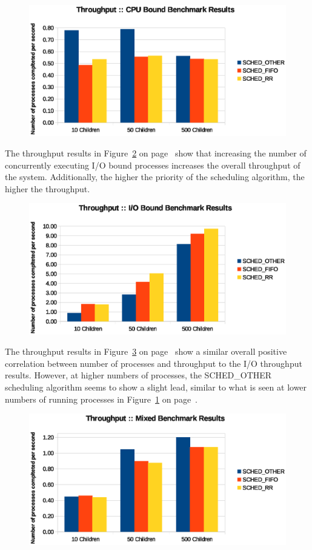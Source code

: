 \begin{figure}[H]
  \centering
  \includegraphics[scale=0.8]{img/cpu-thruput-child.eps}
  \caption{}
  \label{fig:cpu-thruput-child}
\end{figure}

The throughput results in Figure~\ref{fig:io-thruput-child} on page~\pageref{fig:io-thruput-child} show that increasing the number of concurrently executing I/O bound processes increases the overall throughput of the system.  Additionally, the higher the priority of the scheduling algorithm, the higher the throughput.

\begin{figure}[H]
  \centering
  \includegraphics[scale=0.8]{img/io-thruput-child.eps}
  \caption{}
  \label{fig:io-thruput-child}
\end{figure}

The throughput results in Figure~\ref{fig:mix-thruput-child} on page~\pageref{fig:mix-thruput-child} show a similar overall positive correlation between number of processes and throughput to the I/O throughput results.  However, at higher numbers of processes, the SCHED\_OTHER scheduling algorithm seems to show a slight lead, similar to what is seen at lower numbers of running processes in Figure~\ref{fig:cpu-thruput-child} on page~\pageref{fig:cpu-thruput-child}.

\begin{figure}[H]
  \centering
  \includegraphics[scale=0.8]{img/mix-thruput-child.eps}
  \caption{}
  \label{fig:mix-thruput-child}
\end{figure}
